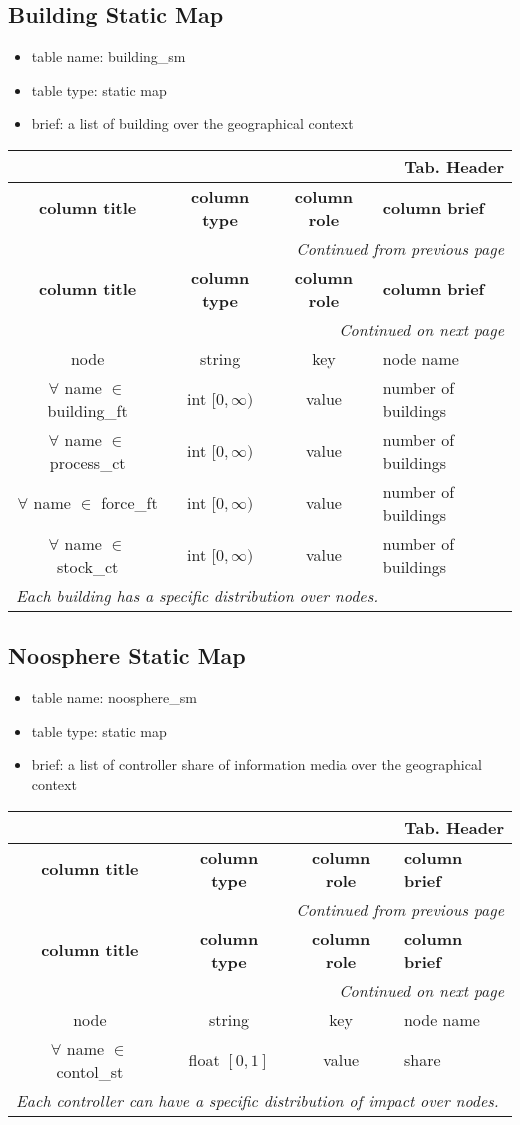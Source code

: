 \documentclass[a4paper,oneside,titlepage]{report}
\newcommand*{\LTHeaderIV}[5]{
  \multicolumn{4}{r}{\textbf{Tab. \thesubsection} \textbf{#1}}\\    
  \hline
  \textbf{#2} & \textbf{#3} & \textbf{#4} & \textbf{#5}\\
  \hline
  
  \endfirsthead
  \multicolumn{4}{r}{\textit{Continued from previous page}}\\    
  \hline
  \textbf{#2} & \textbf{#3} & \textbf{#4} & \textbf{#5}\\
  \hline
  \endhead
  \hline
  \multicolumn{4}{r}{\textit{Continued on next page}}\\
  \endfoot
  \hline
  \endlastfoot  
}
\begin{document}
\subsection{Building Static Map}
\begin{itemize}
  \setlength{\itemsep}{0pt}
  \setlength{\parskip}{0pt}
\item table name: building\_sm  
\item table type: static map  
\item brief: a list of building over the geographical context
\end{itemize}

\begin{longtable}{ |c|c|c|l| } 
  \LTHeaderIV{Header}{column title}{column type}{column role}{column brief}                    
  node & string & key & node name\\
  $\forall$ name $\in$ building\_ft & int $[0, \infty)$ & value & number of buildings \\
  $\forall$ name $\in$ process\_ct & int $[0, \infty)$ & value & number of buildings \\
  $\forall$ name $\in$ force\_ft & int $[0, \infty)$ & value & number of buildings \\
  $\forall$ name $\in$ stock\_ct & int $[0, \infty)$ & value & number of buildings \\
  \multicolumn{4}{|l|}{\textit{Each building has a specific distribution over nodes.}}\\
\end{longtable}        

\subsection{Noosphere Static Map}
\begin{itemize}
  \setlength{\itemsep}{0pt}
  \setlength{\parskip}{0pt}
\item table name: noosphere\_sm  
\item table type: static map  
\item brief: a list of controller share of information media over the geographical context
\end{itemize}

\begin{longtable}{ |c|c|c|l| } 
  \LTHeaderIV{Header}{column title}{column type}{column role}{column brief}                    
  node & string & key & node name\\
  $\forall$ name $\in$ contol\_st & float $[0, 1]$ & value & share \\
  \multicolumn{4}{|l|}{\textit{Each controller can have a specific distribution of impact over nodes.}}\\
\end{longtable}        
\end{document}
